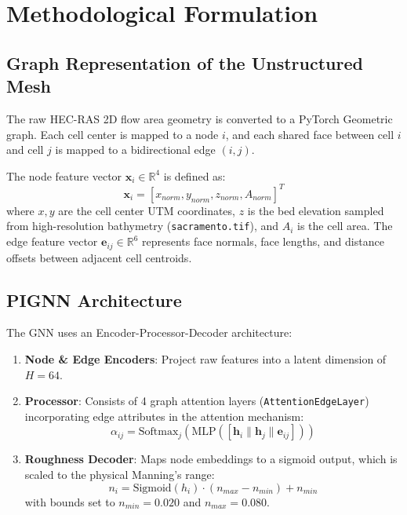 \documentclass[11pt,a4paper]{article}
\begin{document}
\section{Methodological Formulation}

\subsection{Graph Representation of the Unstructured Mesh}
The raw HEC-RAS 2D flow area geometry is converted to a PyTorch Geometric graph. Each cell center is mapped to a node $i$, and each shared face between cell $i$ and cell $j$ is mapped to a bidirectional edge $(i, j)$. 

The node feature vector $\mathbf{x}_i \in \mathbb{R}^4$ is defined as:
\begin{equation}
\mathbf{x}_i = [x_{norm}, y_{norm}, z_{norm}, A_{norm}]^T
\end{equation}
where $x, y$ are the cell center UTM coordinates, $z$ is the bed elevation sampled from high-resolution bathymetry (\texttt{sacramento.tif}), and $A_i$ is the cell area. The edge feature vector $\mathbf{e}_{ij} \in \mathbb{R}^6$ represents face normals, face lengths, and distance offsets between adjacent cell centroids.

\subsection{PIGNN Architecture}
The GNN uses an Encoder-Processor-Decoder architecture:
\begin{enumerate}
    \item \textbf{Node \& Edge Encoders}: Project raw features into a latent dimension of $H=64$.
    \item \textbf{Processor}: Consists of 4 graph attention layers (\texttt{AttentionEdgeLayer}) incorporating edge attributes in the attention mechanism:
    \begin{equation}
    \alpha_{ij} = \text{Softmax}_j \left( \text{MLP} \left( [\mathbf{h}_i \parallel \mathbf{h}_j \parallel \mathbf{e}_{ij}] \right) \right)
    \end{equation}
    \item \textbf{Roughness Decoder}: Maps node embeddings to a sigmoid output, which is scaled to the physical Manning's range:
    \begin{equation}
    n_i = \text{Sigmoid}(h_i) \cdot (n_{max} - n_{min}) + n_{min}
    \end{equation}
    with bounds set to $n_{min} = 0.020$ and $n_{max} = 0.080$.
\end{enumerate}
\end{document}
